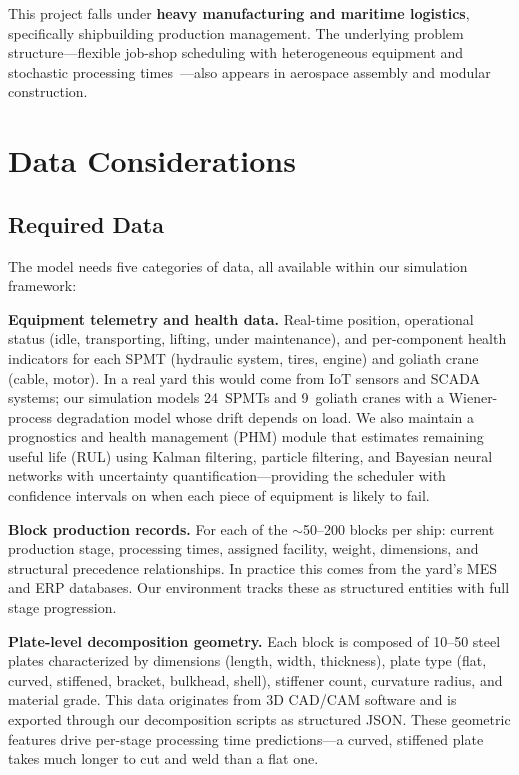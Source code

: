 \documentclass[12pt,letterpaper]{article}
\begin{document}
This project falls under \textbf{heavy manufacturing and maritime logistics}, specifically shipbuilding production management. The underlying problem structure---flexible job-shop scheduling with heterogeneous equipment and stochastic processing times~\cite{pernas2023}---also appears in aerospace assembly and modular construction.

\section{Data Considerations}

\subsection{Required Data}

The model needs five categories of data, all available within our simulation framework:

\textbf{Equipment telemetry and health data.} Real-time position, operational status (idle, transporting, lifting, under maintenance), and per-component health indicators for each SPMT (hydraulic system, tires, engine) and goliath crane (cable, motor). In a real yard this would come from IoT sensors and SCADA systems; our simulation models 24~SPMTs and 9~goliath cranes with a Wiener-process degradation model whose drift depends on load. We also maintain a prognostics and health management (PHM) module that estimates remaining useful life (RUL) using Kalman filtering, particle filtering, and Bayesian neural networks with uncertainty quantification---providing the scheduler with confidence intervals on when each piece of equipment is likely to fail.

\textbf{Block production records.} For each of the $\sim$50--200 blocks per ship: current production stage, processing times, assigned facility, weight, dimensions, and structural precedence relationships. In practice this comes from the yard's MES and ERP databases. Our environment tracks these as structured entities with full stage progression.

\textbf{Plate-level decomposition geometry.} Each block is composed of 10--50 steel plates characterized by dimensions (length, width, thickness), plate type (flat, curved, stiffened, bracket, bulkhead, shell), stiffener count, curvature radius, and material grade. This data originates from 3D CAD/CAM software and is exported through our decomposition scripts as structured JSON. These geometric features drive per-stage processing time predictions---a curved, stiffened plate takes much longer to cut and weld than a flat one.
\end{document}
